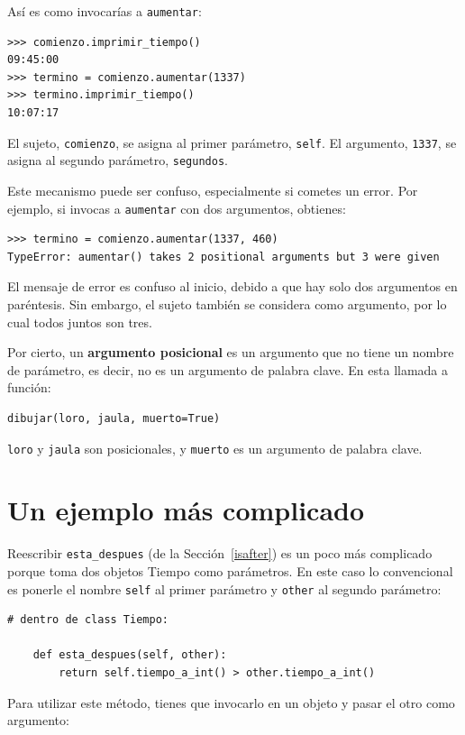 \documentclass[10pt]{book}
\begin{document}
Así es como invocarías a {\tt aumentar}:

\begin{verbatim}
>>> comienzo.imprimir_tiempo()
09:45:00
>>> termino = comienzo.aumentar(1337)
>>> termino.imprimir_tiempo()
10:07:17
\end{verbatim}
%
El sujeto, {\tt comienzo}, se asigna al primer parámetro,
{\tt self}.  El argumento, {\tt 1337}, se asigna al
segundo parámetro, {\tt segundos}.

Este mecanismo puede ser confuso, especialmente si cometes un error.
Por ejemplo, si invocas a {\tt aumentar} con dos argumentos,
obtienes:

\begin{verbatim}
>>> termino = comienzo.aumentar(1337, 460)
TypeError: aumentar() takes 2 positional arguments but 3 were given
\end{verbatim}
%
El mensaje de error es confuso al inicio, debido a que hay
solo dos argumentos en paréntesis.  Sin embargo, el sujeto también
se considera como argumento, por lo cual todos juntos son tres.

Por cierto, un {\bf argumento posicional} es un argumento que
no tiene un nombre de parámetro, es decir, no es un argumento de
palabra clave.  En esta llamada a función:

\begin{verbatim}
dibujar(loro, jaula, muerto=True)
\end{verbatim}

{\tt loro} y {\tt jaula} son posicionales, y {\tt muerto} es
un argumento de palabra clave.


\section{Un ejemplo más complicado}

Reescribir \verb"esta_despues" (de la Sección~\ref{isafter}) es un poco
más complicado porque toma dos objetos Tiempo como parámetros.  En
este caso lo convencional es ponerle el nombre {\tt self} al primer parámetro
y {\tt other} al segundo parámetro: 

\begin{verbatim}
# dentro de class Tiempo:

    def esta_despues(self, other):
        return self.tiempo_a_int() > other.tiempo_a_int()
\end{verbatim}
%
Para utilizar este método, tienes que invocarlo en un objeto y pasar
el otro como argumento:
\end{document}
